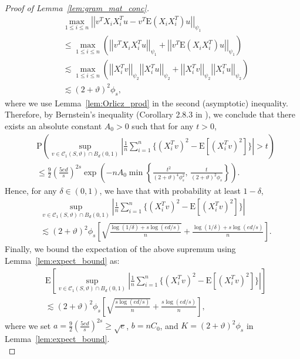 \documentclass[ejsv2,noshowframe]{imsart}
\theoremstyle{plain}
\theoremstyle{definition}
\theoremstyle{remark}
\newcommand{\norm}[1]{\left|\left| #1 \right|\right|}
\begin{document}
\begin{proof}[Proof of Lemma~\ref{lem:gram_mat_conc}]
	\begin{align*}
		&\max_{1\leq i\leq n} \norm{v^T X_iX_i^T u - v^T \mathrm{E}\left(X_iX_i^T\right) u}_{\psi_1} \\
		&\leq \max_{1\leq i \leq n}\left(\norm{v^TX_iX_i^T u}_{\psi_1} + \norm{v^T \mathrm{E}\left(X_iX_i^T\right) u}_{\psi_1} \right)\\
		&\lesssim \max_{1\leq i\leq n} \left(\norm{X_i^Tv}_{\psi_2} \norm{X_i^Tu}_{\psi_2} + \norm{X_i^Tv}_{\psi_2} \norm{X_i^T u}_{\psi_2} \right)\\
		&\lesssim (2+\vartheta)^2 \phi_s,
	\end{align*}
	where we use Lemma~\ref{lem:Orlicz_prod} in the second (asymptotic) inequality. Therefore, by Bernstein's inequality (Corollary 2.8.3 in \citealt{vershynin2018high}), we conclude that there exists an absolute constant $A_0 >0$ such that for any $t>0$,
	\begin{align*}
		&\mathrm{P}\left(\sup_{v\in \mathcal{C}_1(S,\vartheta) \cap B_d(0,1)}\left|\frac{1}{n}\sum_{i=1}^n \Big\{(X_i^T v)^2 - \mathrm{E}\left[(X_i^T v)^2 \right]\Big\}\right| > t \right) \\
		&\leq \frac{9}{2} \left(\frac{5ed}{s} \right)^{2s} \exp\left(-nA_0\min\left\{\frac{t^2}{(2+\vartheta)^4 \phi_s^2},\, \frac{t}{(2+\vartheta)^2 \phi_s} \right\} \right).
	\end{align*}
	Hence, for any $\delta \in (0,1)$, we have that with probability at least $1-\delta$,
	\begin{align*}
		&\sup_{v\in \mathcal{C}_1(S,\vartheta) \cap B_d(0,1)}\left|\frac{1}{n}\sum_{i=1}^n \Big\{(X_i^T v)^2 - \mathrm{E}\left[(X_i^T v)^2 \right]\Big\}\right| \\
		&\lesssim (2+\vartheta)^2 \phi_s \left[\sqrt{\frac{\log(1/\delta) + s\log(ed/s)}{n}} + \frac{\log(1/\delta)  + s\log(ed/s)}{n} \right].
	\end{align*}
	Finally, we bound the expectation of the above supremum using Lemma~\ref{lem:expect_bound} as:
	\begin{align*}
		&\mathrm{E}\left[\sup_{v\in \mathcal{C}_1(S,\vartheta) \cap B_d(0,1)}\left|\frac{1}{n}\sum_{i=1}^n \Big\{(X_i^T v)^2 - \mathrm{E}\left[(X_i^T v)^2 \right]\Big\}\right| \right] \\
		&\lesssim (2+\vartheta)^2 \phi_s \left[\sqrt{\frac{s\log(ed/s)}{n}} + \frac{s\log(ed/s)}{n} \right],
	\end{align*}
	where we set $a=\frac{9}{2} \left(\frac{5ed}{s} \right)^{2s} \geq \sqrt{e}$, $b=nC_0$, and $K=(2+\vartheta)^2 \phi_s$ in Lemma~\ref{lem:expect_bound}.\\
	

\end{proof}
\end{document}
